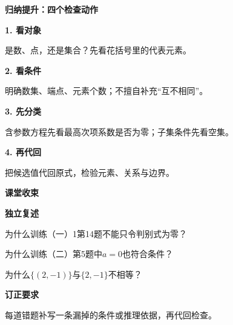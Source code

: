 \documentclass[UTF8,10pt,aspectratio=169]{ctexbeamer}
\newcommand{\PageHeading}[1]{\begin{center}{\Large\bfseries #1}\end{center}\vspace{0.2cm}}
\begin{document}
\begin{frame}
\PageHeading{归纳提升：四个检查动作}
\textbf{1. 看对象}\par 是数、点，还是集合？先看花括号里的代表元素。
\pause\par\vspace{0.25cm}
\textbf{2. 看条件}\par 明确数集、端点、元素个数；不擅自补充“互不相同”。
\pause\par\vspace{0.25cm}
\textbf{3. 先分类}\par 含参数方程先看最高次项系数是否为零；子集条件先看空集。
\pause\par\vspace{0.25cm}
\textbf{4. 再代回}\par 把候选值代回原式，检验元素、关系与边界。
\end{frame}
\begin{frame}
\PageHeading{课堂收束}
\textbf{独立复述}\par
为什么训练（一）1第14题不能只令判别式为零？
\par 为什么训练（二）第5题中$a=0$也符合条件？
\par 为什么$\{(2,-1)\}$与$\{2,-1\}$不相等？
\pause\par\vspace{0.3cm}
\textbf{订正要求}\par 每道错题补写一条漏掉的条件或推理依据，再代回检查。
\end{frame}
\end{document}
